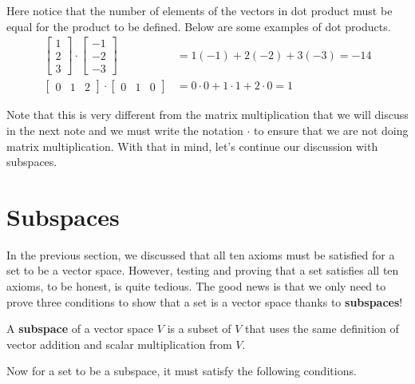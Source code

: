 \documentclass[../main.tex]{subfiles}
\begin{document}
Here notice that the number of elements of the vectors in dot product
must be equal for the product to be defined. Below are some examples
of dot products.
\begin{align*}
\begin{bmatrix}
    1 \\
    2 \\
    3
\end{bmatrix}
\cdot
\begin{bmatrix}
    -1 \\
    -2 \\
    -3
\end{bmatrix}
&= 1(-1) + 2(-2) + 3(-3)
= -14 \\
\begin{bmatrix}
    0 & 1 & 2
\end{bmatrix}
\cdot
\begin{bmatrix}
    0 & 1 & 0
\end{bmatrix}
&= 0 \cdot 0 + 1 \cdot 1 + 2 \cdot 0
= 1
\end{align*}

Note that this is very different from the matrix multiplication
that we will discuss in the next note and we must write the
notation $\cdot$ to ensure that we are not doing matrix
multiplication. With that in mind, let's continue our discussion
with subspaces.

\section{Subspaces}

In the previous section, we discussed that all ten axioms must be
satisfied for a set to be a vector space. However, testing and
proving that a set satisfies all ten axioms, to be honest, is quite
tedious. The good news is that we only need to prove three conditions
to show that a set is a vector space thanks to \textbf{subspaces}!

\begin{definition}
A \textbf{subspace} of a vector space $V$ is a subset of $V$ that uses
the same definition of vector addition and scalar multiplication from
$V$.
\end{definition}

Now for a set to be a subspace, it must satisfy the following
conditions.
\end{document}
